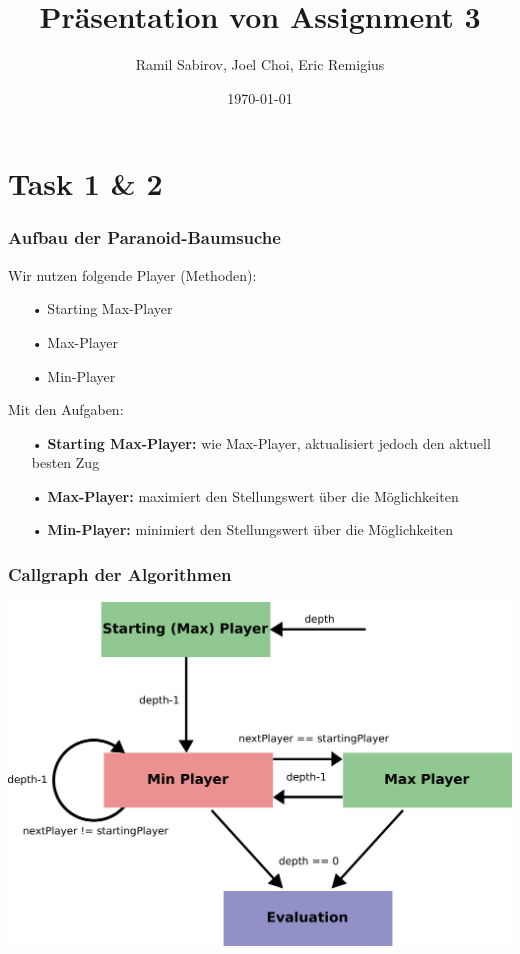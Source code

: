 \documentclass{beamer}
\title[Assignment 3]{Präsentation von Assignment 3} %
\author{Ramil Sabirov, Joel Choi, Eric Remigius} %
\institute[] %
{
RWTH Aachen \\ %
\medskip
\textit{Gruppe3} %
}
\date{\today} %
\begin{document}
\begin{frame}
\titlepage %
\end{frame}


\section{Task 1 & 2}

\begin{frame}
\frametitle{Aufbau der Paranoid-Baumsuche}
Wir nutzen folgende Player (Methoden):
\begin{enumerate}
\item[•] Starting Max-Player
\item[•] Max-Player
\item[•] Min-Player
\end{enumerate}\hfill\break
Mit den Aufgaben:
\begin{enumerate}
\item[•] \textbf{Starting Max-Player:} wie Max-Player, aktualisiert jedoch den aktuell besten Zug
\item[•] \textbf{Max-Player:} maximiert den Stellungswert über die Möglichkeiten
\item[•] \textbf{Min-Player:} minimiert den Stellungswert über die Möglichkeiten
\end{enumerate}

\end{frame}


\begin{frame}
\frametitle{Callgraph der Algorithmen}


\begin{center}
	\includegraphics[scale=0.2]{figures/MinMaxCallGraph.pdf}
\end{center}

\end{frame}
\end{document}
